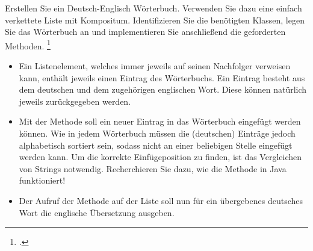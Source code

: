 \documentclass{bschlangaul-aufgabe}
\begin{document}

Erstellen Sie ein Deutsch-Englisch Wörterbuch. Verwenden Sie dazu eine
einfach verkettete Liste mit Kompositum. Identifizieren Sie die
benötigten Klassen, legen Sie das Wörterbuch an und implementieren Sie
anschließend die geforderten Methoden.
\footcite[Seite 4, Aufgabe 5]{aud:ab:5}

\begin{itemize}
\item Ein Listenelement, welches immer jeweils auf seinen Nachfolger
verweisen kann, enthält jeweils einen Eintrag des Wörterbuchs. Ein
Eintrag besteht aus dem deutschen und dem zugehörigen englischen Wort.
Diese können natürlich jeweils zurückgegeben werden.

\item Mit der Methode  soll ein neuer Eintrag in das Wörterbuch eingefügt werden
können. Wie in jedem Wörterbuch müssen die (deutschen) Einträge jedoch
alphabetisch sortiert sein, sodass nicht an einer beliebigen Stelle
eingefügt werden kann. Um die korrekte Einfügeposition zu finden, ist
das Vergleichen von Strings notwendig. Recherchieren Sie dazu, wie die
Methode  in Java funktioniert!

\item Der Aufruf der Methode  auf
der Liste soll nun für ein übergebenes deutsches Wort die englische
Übersetzung ausgeben.

\end{itemize}
\end{document}
